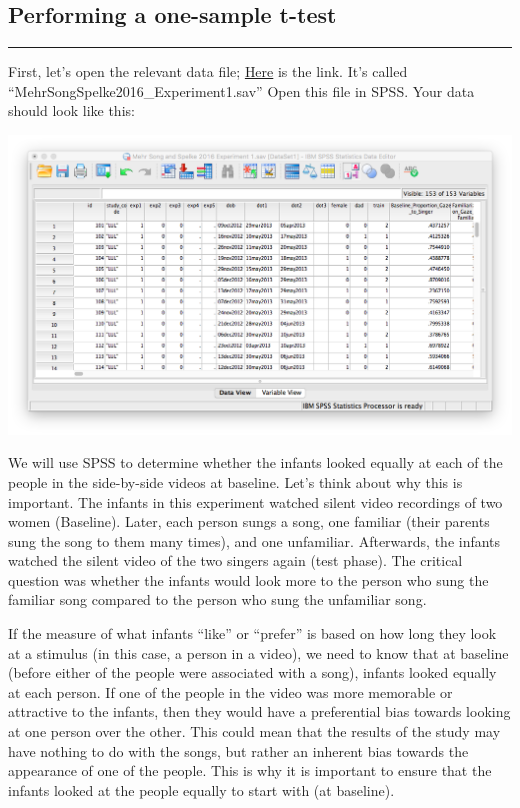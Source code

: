 \documentclass[
]{book}
\begin{document}
\hypertarget{performing-a-one-sample-t-test}{%
\subsection{Performing a one-sample t-test}\label{performing-a-one-sample-t-test}}

\begin{center}\rule{0.5\linewidth}{0.5pt}\end{center}

First, let's open the relevant data file; \href{https://github.com/CrumpLab/statisticsLab/blob/master/data/spssdata/MehrSongSpelke2016_Experiment1.sav}{Here} is the link. It's called ``MehrSongSpelke2016\_Experiment1.sav'' Open this file in SPSS. Your data should look like this:

\includegraphics{img/6.4.11.png}

We will use SPSS to determine whether the infants looked equally at each of the people in the side-by-side videos at baseline. Let's think about why this is important. The infants in this experiment watched silent video recordings of two women (Baseline). Later, each person sungs a song, one familiar (their parents sung the song to them many times), and one unfamiliar. Afterwards, the infants watched the silent video of the two singers again (test phase). The critical question was whether the infants would look more to the person who sung the familiar song compared to the person who sung the unfamiliar song.

If the measure of what infants ``like'' or ``prefer'' is based on how long they look at a stimulus (in this case, a person in a video), we need to know that at baseline (before either of the people were associated with a song), infants looked equally at each person. If one of the people in the video was more memorable or attractive to the infants, then they would have a preferential bias towards looking at one person over the other. This could mean that the results of the study may have nothing to do with the songs, but rather an inherent bias towards the appearance of one of the people. This is why it is important to ensure that the infants looked at the people equally to start with (at baseline).
\end{document}
